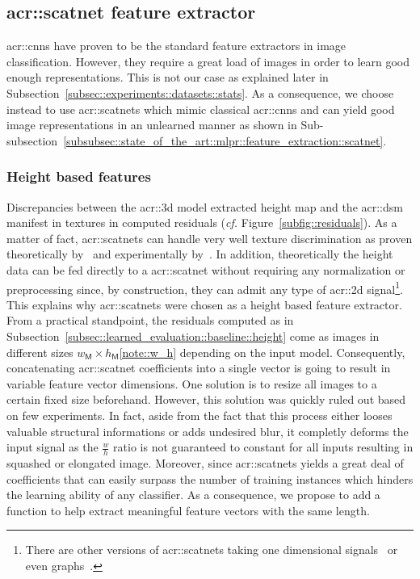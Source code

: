     \subsection{\acrshort*{acr::scatnet} feature extractor}
        \label{subsec::learned_evaluation::richer_features::image}
        \glspl{acr::cnn} have proven to be the standard feature extractors in image classification.
        However, they require a great load of images in order to learn good enough representations.
        This is not our case as explained later in Subsection~\ref{subsec::experiments::datasets::stats}.
        As a consequence, we choose instead to use \glspl{acr::scatnet} which mimic classical \glspl{acr::cnn} and can yield good image representations in an unlearned manner as shown in Sub-subsection~\ref{subsubsec::state_of_the_art::mlpr::feature_extraction::scatnet}.

        \subsubsection{Height based features}
            Discrepancies between the \gls{acr::3d} model extracted height map and the \gls{acr::dsm} manifest in textures in computed residuals (\textit{cf.} Figure~\ref{subfig::residuals}).
            As a matter of fact, \glspl{acr::scatnet} can handle very well texture discrimination as proven theoretically by~\textcite{mallat2012group} and experimentally by~\textcite{bruna2013invariant,sifre2013rotation}.
            In addition, theoretically the height data can be fed directly to a \gls{acr::scatnet} without requiring any normalization or preprocessing since, by construction, they can admit any type of \gls{acr::2d} signal\footnote{There are other versions of \glspl{acr::scatnet} taking one dimensional signals~\parencite{anden2014deep} or even graphs~\parencite{eickenberg2018solid}.}.
            This explains why \glspl{acr::scatnet} were chosen as a height based feature extractor.\\

            From a practical standpoint, the residuals computed as in Subsection~\ref{subsec::learned_evaluation::baseline::height} come as images in different sizes \(w_{\mathsf{M}} \times h_{\mathsf{M}}\)\cref{note::w_h} depending on the input model.
            Consequently, concatenating \gls{acr::scatnet} coefficients into a single vector is going to result in variable feature vector dimensions.
            One solution is to resize all images to a certain fixed size beforehand.
            However, this solution was quickly ruled out based on few experiments.
            In fact, aside from the fact that this process either looses valuable structural informations or adds undesired blur, it completly deforms the input signal as the \(\frac{w}{h}\) ratio is not guaranteed to constant for all inputs resulting in squashed or elongated image.
            Moreover, since \glspl{acr::scatnet} yields a great deal of coefficients that can easily surpass the number of training instances which hinders the learning ability of any classifier.
            As a consequence, we propose to add a function to help extract meaningful feature vectors with the same length.\\


